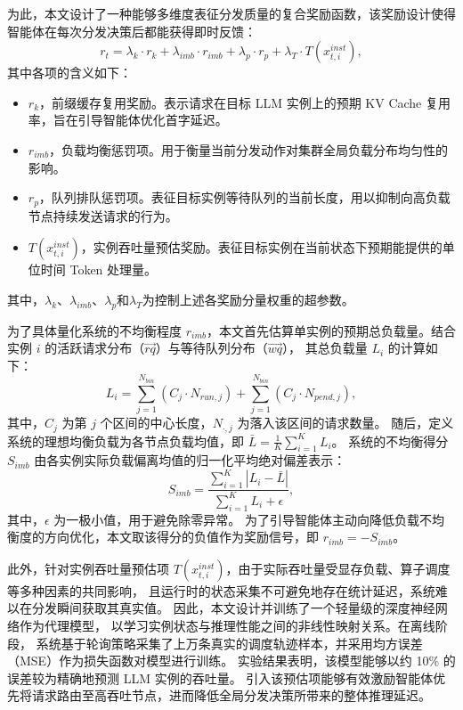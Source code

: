 为此，本文设计了一种能够多维度表征分发质量的复合奖励函数，该奖励设计使得智能体在每次分发决策后都能获得即时反馈：
\begin{equation}\label{eq:dispatch-reward}
  r_t = \lambda_k \cdot r_k + \lambda_{imb} \cdot r_{imb} + \lambda_p \cdot r_{p} + \lambda_T \cdot T\left(x_{t,i}^{inst}\right),
\end{equation}
\noindent 其中各项的含义如下：

\begin{itemize}
  \item $r_k$，前缀缓存复用奖励。表示请求在目标 LLM 实例上的预期 KV Cache 复用率，旨在引导智能体优化首字延迟。
  \item $r_{imb}$，负载均衡惩罚项。用于衡量当前分发动作对集群全局负载分布均匀性的影响。
  \item $r_{p}$，队列排队惩罚项。表征目标实例等待队列的当前长度，用以抑制向高负载节点持续发送请求的行为。
  \item $T\left(x_{t,i}^{inst}\right)$，实例吞吐量预估奖励。表征目标实例在当前状态下预期能提供的单位时间 Token 处理量。
\end{itemize}
其中，$\lambda_k$、$\lambda_{imb}$、$\lambda_p$和$\lambda_T$为控制上述各奖励分量权重的超参数。

为了具体量化系统的不均衡程度 $r_{imb}$，本文首先估算单实例的预期总负载量。结合实例 $i$ 的活跃请求分布（$\vec{rq}$）与等待队列分布（$\vec{wq}$），
其总负载量 $L_i$ 的计算如下：
\begin{equation}
  L_i = \sum_{j=1}^{N_{bin}} \left(C_j \cdot N_{run,j}\right) + \sum_{j=1}^{N_{bin}} \left(C_j \cdot N_{pend,j}\right),
\end{equation}
\noindent 其中，$C_j$ 为第 $j$ 个区间的中心长度，$N_{\cdot,j}$ 为落入该区间的请求数量。
随后，定义系统的理想均衡负载为各节点负载均值，即 $\bar{L} = \frac{1}{K} \sum_{i=1}^{K} L_i$。
系统的不均衡得分 $S_{imb}$ 由各实例实际负载偏离均值的归一化平均绝对偏差表示：
\begin{equation}
  S_{imb} = \frac{\sum_{i=1}^{K} \left|L_i - \bar{L}\right|}{\sum_{i=1}^{K} L_i + \epsilon},
\end{equation}
\noindent 其中，$\epsilon$ 为一极小值，用于避免除零异常。
为了引导智能体主动向降低负载不均衡度的方向优化，本文取该得分的负值作为奖励信号，即 $r_{imb} = -S_{imb}$。

此外，针对实例吞吐量预估项 $T\left(x_{t,i}^{inst}\right)$，由于实际吞吐量受显存负载、算子调度等多种因素的共同影响，
且运行时的状态采集不可避免地存在统计延迟，系统难以在分发瞬间获取其真实值。
因此，本文设计并训练了一个轻量级的深度神经网络作为代理模型，
以学习实例状态与推理性能之间的非线性映射关系。在离线阶段，
系统基于轮询策略采集了上万条真实的调度轨迹样本，并采用均方误差（MSE）作为损失函数对模型进行训练。
实验结果表明，该模型能够以约 10\% 的误差较为精确地预测 LLM 实例的吞吐量。
引入该预估项能够有效激励智能体优先将请求路由至高吞吐节点，进而降低全局分发决策所带来的整体推理延迟。

